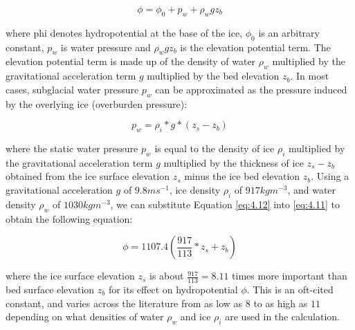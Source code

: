 \begin{equation}\label{eq:4.11}
  \phi = \phi_0 + p_w + \rho_wgz_b
\end{equation}

where \gls{phi} denotes hydropotential at the base of the ice, $\phi_0$ is an arbitrary constant, $p_w$ is water pressure and $\rho_wgz_b$ is the elevation potential term.
The elevation potential term is made up of the density of water $\rho_w$ multiplied by the gravitational acceleration term $g$ multiplied by the bed elevation $z_b$.
In most cases, subglacial water pressure $p_w$ can be approximated as the pressure induced by the overlying ice (overburden pressure):

\begin{equation}\label{eq:4.12}
  p_w = \rho_i * g * (z_s - z_b)
\end{equation}

where the static water pressure $p_w$ is equal to the density of ice $\rho_i$ multiplied by the gravitational acceleration term $g$ multiplied by the thickness of ice $z_s - z_b$ obtained from the ice surface elevation $z_s$ minus the ice bed elevation $z_b$.
Using a gravitational acceleration $g$ of $9.8ms^{-1}$, ice density $\rho_i$ of $917kgm^{-3}$, and water density $\rho_w$ of $1030kgm^{-3}$, we can substitute Equation \eqref{eq:4.12} into \eqref{eq:4.11} to obtain the following equation:

\begin{equation}\label{eq:4.13}
  \phi = 1107.4\left(\frac{917}{113} * z_s + z_b \right)
\end{equation}

where the ice surface elevation $z_s$ is about $\frac{917}{113} = 8.11$ times more important than bed surface elevation $z_b$ for its effect on hydropotential $\phi$.
This is an oft-cited constant, and varies across the literature from as low as $8$ to as high as $11$ depending on what densities of water $\rho_w$ and ice $\rho_i$ are used in the calculation.


